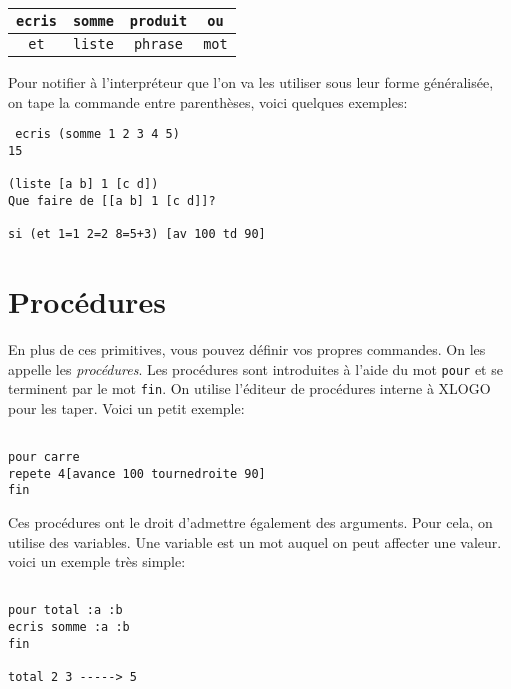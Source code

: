 \begin{center}
 \begin{tabular}{cccc}
 \texttt{ecris} & \texttt{somme}&\texttt{produit} &\texttt{ou}\\
\hline
\texttt{et}&\texttt{liste}&\texttt{phrase}& \texttt{mot}\\
 \end{tabular} 
\end{center}
Pour notifier à l'interpréteur que l'on va les utiliser sous leur forme généralisée, on tape la commande entre parenthèses, voici quelques exemples: 
 \begin{verbatim}
 ecris (somme 1 2 3 4 5)
15

(liste [a b] 1 [c d])
Que faire de [[a b] 1 [c d]]?

si (et 1=1 2=2 8=5+3) [av 100 td 90]
\end{verbatim}

\section{Procédures}
En plus de ces primitives, vous pouvez définir vos propres commandes. On les appelle les \textit{procédures}. Les procédures sont introduites à l'aide du mot \texttt{pour} et se terminent par le mot \texttt{fin}. On utilise l'éditeur de procédures interne à XLOGO pour les taper. Voici un petit exemple:
\begin{verbatim}

pour carre
repete 4[avance 100 tournedroite 90]
fin

\end{verbatim}

Ces procédures ont le droit d'admettre également des arguments. Pour cela, on utilise des variables. Une variable est un mot auquel on peut affecter une valeur. voici un exemple très simple:

\begin{verbatim}

pour total :a :b
ecris somme :a :b
fin

total 2 3 -----> 5

\end{verbatim}

